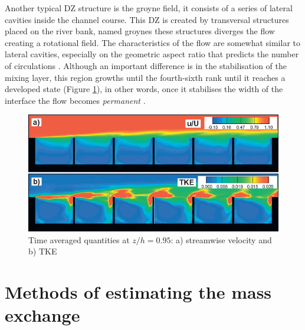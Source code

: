 Another typical DZ structure is the groyne field, it consists of a series of lateral cavities inside the channel course. This DZ is created by transversal structures placed on the river bank, named groynes these structures diverges the flow creating a rotational field. The characteristics of the flow are somewhat similar to lateral cavities, especially on the geometric aspect ratio that predicts the number of circulations \cite{weitbrecht2004,uijttewaal2005,xiang2020}. Although an important difference is in the stabilisation of the mixing layer, this region growths until the fourth-sixth rank until it reaches a developed state (Figure \ref{fig:groyneStabilisation}), in other words, once it stabilises the width of the interface the flow becomes \textit{permanent} \cite{weitbrecht2004, mcCoy2008, xiang2020}.

\begin{figure}[!ht]
\centering
\includegraphics[width=0.9\linewidth]{../images/introduction/groyneStabilisation.png}
\caption{Time averaged quantities at $z/h=0.95$: a) streamwise velocity and b) TKE \cite{mcCoy2008}}
\label{fig:groyneStabilisation}
\end{figure}

\section{Methods of estimating the mass exchange }
